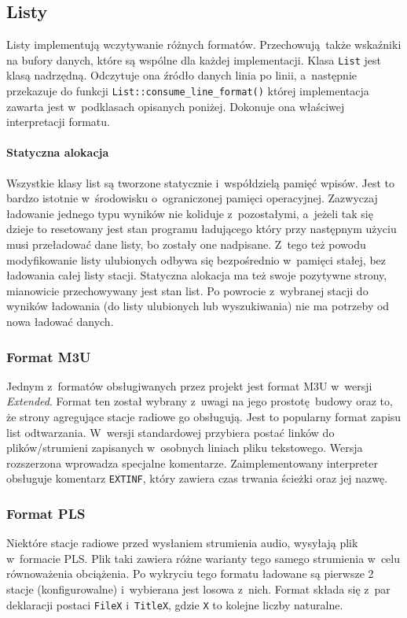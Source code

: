\documentclass[polish]{aghengthesis}
\begin{document}
		\subsection{Listy}
			Listy implementują wczytywanie różnych formatów. Przechowują także wskaźniki na bufory danych, które są wspólne dla każdej implementacji. Klasa \lstinline|List| jest klasą nadrzędną. Odczytuje ona źródło danych linia po linii, a~następnie przekazuje do funkcji \lstinline|List::consume_line_format()| której implementacja zawarta jest w~podklasach opisanych poniżej. Dokonuje ona właściwej interpretacji formatu.
			
			\paragraph{Statyczna alokacja} Wszystkie klasy list są tworzone statycznie i~współdzielą pamięć wpisów. Jest to bardzo istotnie w~środowisku o~ograniczonej pamięci operacyjnej. Zazwyczaj ładowanie jednego typu wyników nie koliduje z~pozostałymi, a~jeżeli tak się dzieje to resetowany jest stan programu ładującego który przy następnym użyciu musi przeładować dane listy, bo zostały one nadpisane. Z~tego też powodu modyfikowanie listy ulubionych odbywa się bezpośrednio w~pamięci stałej, bez ładowania całej listy stacji. Statyczna alokacja ma też swoje pozytywne strony, mianowicie przechowywany jest stan list. Po powrocie z~wybranej stacji do wyników ładowania (do listy ulubionych lub wyszukiwania) nie ma potrzeby od nowa ładować danych.
			
			\subsubsection{Format M3U}
				Jednym z~formatów obsługiwanych przez projekt jest format M3U\textsuperscript{\cite{m3u}} w~wersji \textit{Extended}. Format ten został wybrany z~uwagi na jego prostotę budowy oraz to, że strony agregujące stacje radiowe go obsługują. Jest to popularny format zapisu list odtwarzania. W~wersji standardowej przybiera postać linków do plików/strumieni zapisanych w~osobnych liniach pliku tekstowego. Wersja rozszerzona wprowadza specjalne komentarze. Zaimplementowany interpreter obsługuje komentarz \lstinline|EXTINF|, który zawiera czas trwania ścieżki oraz jej nazwę.
			
			\subsubsection{Format PLS}
				Niektóre stacje radiowe przed wysłaniem strumienia audio, wysyłają plik w~formacie PLS\textsuperscript{\cite{pls}}. Plik taki zawiera różne warianty tego samego strumienia w~celu równoważenia obciążenia. Po wykryciu tego formatu ładowane są pierwsze 2 stacje (konfigurowalne) i~wybierana jest losowa z~nich. Format składa się z~par deklaracji postaci \lstinline|FileX| i~\lstinline|TitleX|, gdzie \lstinline|X| to kolejne liczby naturalne.
			
\end{document}
